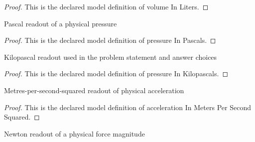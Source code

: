 \begin{proof}
  This is the declared model definition of volume In Liters.
\end{proof}
\begin{definition}
  \label{def:physics:phyx-mini-0396:phyxminiproblems-problemphyxmini0396-pressureinpascals}
  Pascal readout of a physical pressure
\end{definition}
\begin{proof}
  This is the declared model definition of pressure In Pascals.
\end{proof}
\begin{definition}
  \label{def:physics:phyx-mini-0396:phyxminiproblems-problemphyxmini0396-pressureinkilopascals}
  Kilopascal readout used in the problem statement and answer choices
\end{definition}
\begin{proof}
  This is the declared model definition of pressure In Kilopascals.
\end{proof}
\begin{definition}
  \label{def:physics:phyx-mini-0396:phyxminiproblems-problemphyxmini0396-accelerationinmeterspersecondsquared}
  Metres-per-second-squared readout of physical acceleration
\end{definition}
\begin{proof}
  This is the declared model definition of acceleration In Meters Per Second Squared.
\end{proof}
\begin{definition}
  \label{def:physics:phyx-mini-0396:phyxminiproblems-problemphyxmini0396-forceinnewtons}
  Newton readout of a physical force magnitude
\end{definition}
